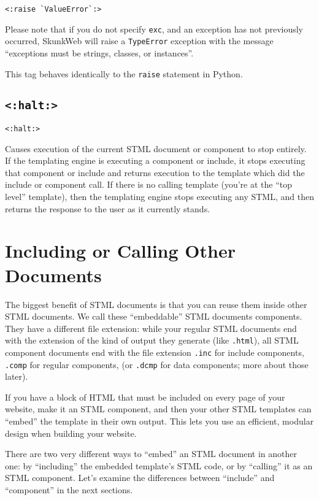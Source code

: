 \documentclass{manual}
\begin{document}
\begin{verbatim}
<:raise `ValueError`:>
\end{verbatim}

Please note that if you do not specify \texttt{exc}, and an exception
has not previously occurred, SkunkWeb will raise a \texttt{TypeError}
exception with the message ``exceptions must be strings, classes, or
instances''.

This tag behaves identically to the \texttt{raise} statement in Python.




\section{\texttt{<:halt:>}}
\label{taghalt}
\begin{verbatim}<:halt:>\end{verbatim}

Causes execution of the current STML document or component to stop
entirely. If the templating engine is executing a component or
include, it stops executing that component or include and returns
execution to the template which did the include or component call.  If
there is no calling template (you're at the ``top level'' template),
then the templating engine stops executing any STML, and then returns
the response to the user as it currently stands.


\chapter{Including or Calling Other Documents}
\label{stmlrefexecute}

The biggest benefit of STML documents is that you can 
reuse them inside other STML documents. We call these
``embeddable'' STML documents components. They have a different
file extension: while your regular STML documents end with
the extension of the kind of output they generate (like
\texttt{.html}), all STML component documents end with the file
extension
\texttt{.inc} for include components, \texttt{.comp} for 
regular components, (or \texttt{.dcmp} for data components; more about
those later).

If you have a block of HTML that must be included on 
every page of your website, make it an STML component, 
and then your other STML templates can ``embed'' the template 
in their own output. This lets you use an efficient, modular 
design when building your website.

There are two very different ways to ``embed'' an STML document 
in another one: by ``including'' the embedded template's STML code, 
or by ``calling'' it as an STML component. Let's examine the 
differences between ``include'' and ``component'' in the next sections.
\end{document}
